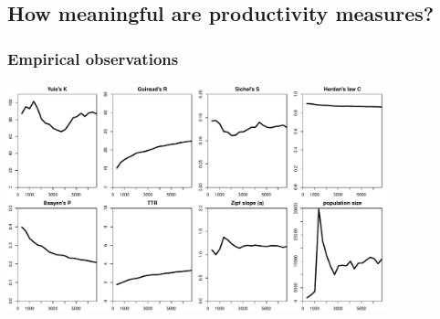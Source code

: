 \documentclass[t]{beamer} %
\begin{document}
\subsection{How meaningful are productivity measures?}

\begin{frame}[c]
  \frametitle{Empirical observations}

  \centering
  \includegraphics[width=11cm]{img/bare_bncS_obs_lexical_constants}
\end{frame}
\end{document}
